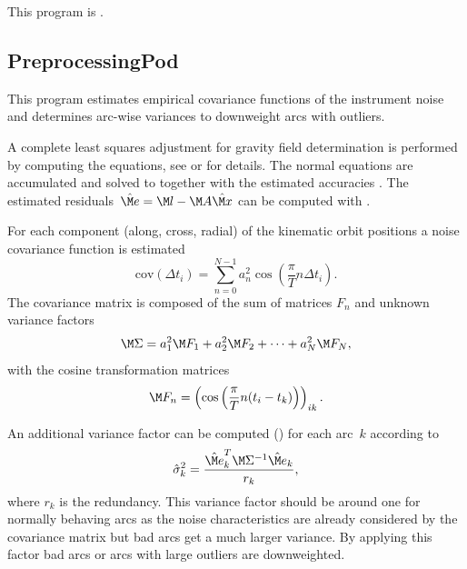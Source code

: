 This program is .
\clearpage
\subsection{PreprocessingPod}\label{PreprocessingPod}
This program estimates empirical covariance functions of the instrument noise and determines arc-wise variances to
downweight arcs with outliers.

A complete least squares adjustment for gravity field determination is performed by computing the 
equations, see  or
 for details. The normal equations
are accumulated and solved to  together with the estimated accuracies
. The estimated residuals~$\hat{\M e}=\M l-\M A\hat{\M x}$ can be computed with
.

For each component (along, cross, radial) of the kinematic orbit positions a noise covariance function is estimated
\begin{equation}
  \text{cov}(\Delta t_i) = \sum_{n=0}^{N-1} a_n^2 \cos\left(\frac{\pi}{T} n\Delta t_i\right).
\end{equation}
The covariance matrix is composed of the sum of matrices $F_n$ and unknown variance factors
\begin{equation}
  \M\Sigma = a_1^2\M F_1 + a_2^2 \M F_2 + \cdots + a_N^2\M F_N,
\end{equation}
with the cosine transformation matrices
\begin{equation}
  \M F_n = \left(\cos\left(\frac{\pi}{T} n(t_i-t_k)\right)\right)_{ik}.
\end{equation}

An additional variance factor can be computed () for each arc~$k$  according to
\begin{equation}
  \hat{\sigma}_k^2 = \frac{\hat{\M e}_k^T\M\Sigma^{-1}\hat{\M e}_k}{r_k},
\end{equation}
where $r_k$ is the redundancy. This variance factor should be around one for normally behaving arcs
as the noise characteristics are already considered by the covariance matrix but bad arcs get a much larger variance.
By applying this factor bad arcs or arcs with large outliers are downweighted.


